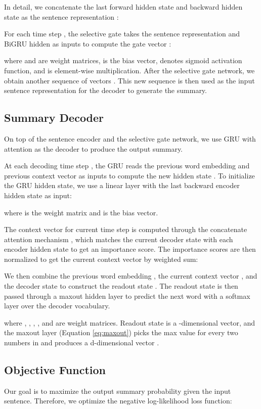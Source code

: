\documentclass[11pt,a4paper]{article}
\begin{document}
In detail, we concatenate the last forward hidden state  and backward hidden state  as the sentence representation :


For each time step , the selective gate takes the sentence representation  and BiGRU hidden  as inputs to compute the  gate vector :

where  and  are weight matrices,  is the bias vector,  denotes sigmoid activation function, and  is element-wise multiplication.
After the selective gate network, we obtain another sequence of vectors .
This new sequence is then used as the input sentence representation for the decoder to generate the summary.


\subsection{Summary Decoder}
On top of the sentence encoder and the selective gate network, we use GRU with attention as the decoder to produce the output summary.

At each decoding time step , the GRU reads the previous word embedding  and previous context vector  as inputs to compute the new hidden state . To initialize the GRU hidden state, we use a linear layer with the last backward encoder hidden state  as input:

where  is the weight matrix and  is the bias vector.

The context vector  for current time step  is computed through the concatenate attention mechanism \citep{luong-pham-manning:2015:EMNLP}, which matches the current decoder state  with each encoder hidden state  to get an importance score. The importance scores are then normalized to get the current context vector by weighted sum:


We then combine the previous word embedding , the current context vector , and the decoder state  to construct the readout state .
The readout state is then passed through a maxout hidden layer \citep{goodfellow2013maxout} to predict the next word with a softmax layer over the decoder vocabulary.

where , , , ,  and  are weight matrices.
Readout state  is a -dimensional vector, and the maxout layer (Equation \ref{eq:maxout}) picks the max value for every two numbers in  and produces a d-dimensional vector .



\subsection{Objective Function}
Our goal is to maximize the output summary probability given the input sentence.
Therefore, we optimize the negative log-likelihood loss function:
\end{document}

